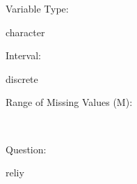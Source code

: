 \documentclass[
]{article}
\begin{document}
\begin{minipage}[t]{0.3\linewidth}

Variable Type:

\end{minipage}%
\begin{minipage}[t]{0.7\linewidth}

character

\end{minipage}

\begin{minipage}[t]{0.3\linewidth}

Interval:

\end{minipage}%
\begin{minipage}[t]{0.7\linewidth}

discrete

\end{minipage}

\begin{minipage}[t]{0.3\linewidth}

Range of Missing Values (M):

\end{minipage}%
\begin{minipage}[t]{0.7\linewidth}

~

\end{minipage}

\begin{minipage}[t]{0.3\linewidth}

Question:

\end{minipage}%
\begin{minipage}[t]{0.7\linewidth}

reliy

\end{minipage}
\end{document}
